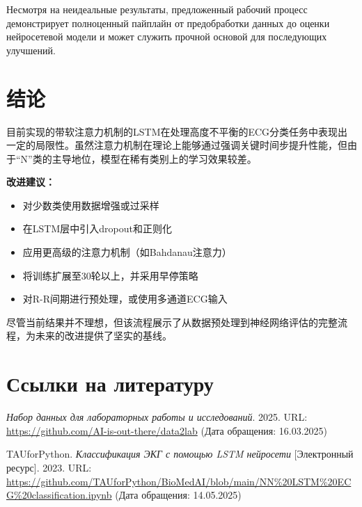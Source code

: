 \documentclass{article}
\providecommand{\pcsync}{\par\vspace{\baselineskip}}
\begin{document}
\begin{paracol}{2}
Несмотря на неидеальные результаты, предложенный рабочий процесс демонстрирует полноценный пайплайн от предобработки данных до оценки нейросетевой модели и может служить прочной основой для последующих улучшений.

\switchcolumn

\section{结论}
\pcsync
目前实现的带软注意力机制的LSTM在处理高度不平衡的ECG分类任务中表现出一定的局限性。虽然注意力机制在理论上能够通过强调关键时间步提升性能，但由于“N”类的主导地位，模型在稀有类别上的学习效果较差。

\textbf{改进建议：}
\begin{itemize}
    \item 对少数类使用数据增强或过采样
    \item 在LSTM层中引入dropout和正则化
    \item 应用更高级的注意力机制（如Bahdanau注意力）
    \item 将训练扩展至30轮以上，并采用早停策略
    \item 对R-R间期进行预处理，或使用多通道ECG输入
\end{itemize}

尽管当前结果并不理想，但该流程展示了从数据预处理到神经网络评估的完整流程，为未来的改进提供了坚实的基线。

\switchcolumn*






\section{Ссылки на литературу}
\pcsync
\renewcommand{\refname}{}
\begin{thebibliography}{9}

\textit{Набор данных для лабораторных работы и исследований}. 2025. URL: \url{https://github.com/AI-is-out-there/data2lab} (Дата обращения: 16.03.2025)


TAUforPython. \textit{Классификация ЭКГ с помощью LSTM нейросети} [Электронный ресурс]. 2023. URL: \url{https://github.com/TAUforPython/BioMedAI/blob/main/NN%20LSTM%20ECG%20classification.ipynb} (Дата обращения: 14.05.2025)

\end{thebibliography}

\vfill\null


\end{paracol}
\end{document}
